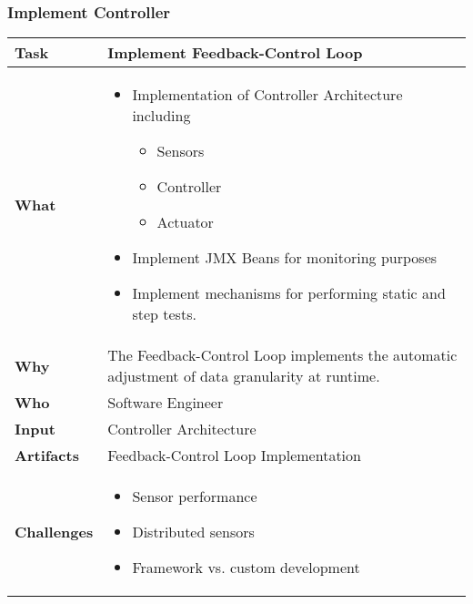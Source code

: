 \subsubsection{Implement Controller}
\begin{minipage}{\textwidth}
 \label{table:ch6_Task_Implement_Controller}
\begin{tabular}
	{|m{3cm}|m{10cm}|} \hline \bfseries Task & Implement Feedback-Control Loop\\
	\hline \bfseries What & 
	\begin{itemize}
		\item Implementation of Controller Architecture including
		\begin{itemize}
			\item Sensors
			\item Controller
			\item Actuator
		\end{itemize}
		\item Implement JMX Beans for monitoring purposes
		\item Implement mechanisms for performing static and step tests.
	\end{itemize}
	\\
	\hline \bfseries Why & The Feedback-Control Loop implements the automatic adjustment of data granularity at runtime.\\
	\hline \bfseries Who & Software Engineer\\
	\hline \bfseries Input & Controller Architecture\\
	\hline \bfseries Artifacts & Feedback-Control Loop Implementation\\
	\hline \bfseries Challenges & 
		\begin{itemize}
			\item Sensor performance
			\item Distributed sensors 
			\item Framework vs. custom development
		\end{itemize}\\
	\hline 
\end{tabular}
\end{minipage}

